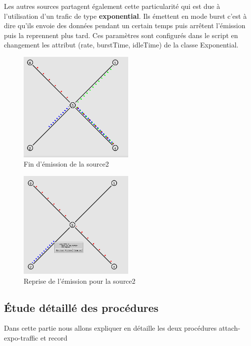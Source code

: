 \documentclass[11pt]{article}
\begin{document}
Les autres sources partagent également cette  particularité qui est due à l'utilisation d'un trafic de type \textbf{exponential}. Ils émettent en mode burst c'est à dire qu'ils envoie des données pendant un certain temps puis arrêtent l'émission puis la reprennent plus tard. Ces paramètres sont configurés dans le script en changement les attribut (rate, burstTime, idleTime) de la classe Exponential.
 
\begin{figure}[H]
	\begin{center}
		\includegraphics[width=0.5\textwidth]{assets/tp3/finduBurstSource2.png}
	\end{center}
	\caption{Fin d'émission de la source2}
	\label{finBurstSource2}
\end{figure}

\begin{figure}[H]
	\begin{center}
		\includegraphics[width=0.5\textwidth]{assets/tp3/repirseDuBurstSource2.png}
	\end{center}
	\caption{Reprise de l'émission pour la source2}
	\label{repriseBurstSource2}
\end{figure}

\subsection{Étude détaillé des procédures}
Dans cette partie nous allons expliquer en détaille les deux procédures attach-expo-traffic et record
\end{document}
